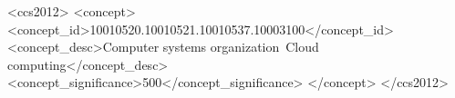 \documentclass[sigplan,10pt]{acmart}\settopmatter{printacmref=false}
\begin{document}





\begin{CCSXML}
<ccs2012>
<concept>
<concept_id>10010520.10010521.10010537.10003100</concept_id>
<concept_desc>Computer systems organization~Cloud computing</concept_desc>
<concept_significance>500</concept_significance>
</concept>
</ccs2012>
\end{CCSXML}




\maketitle
\end{document}
